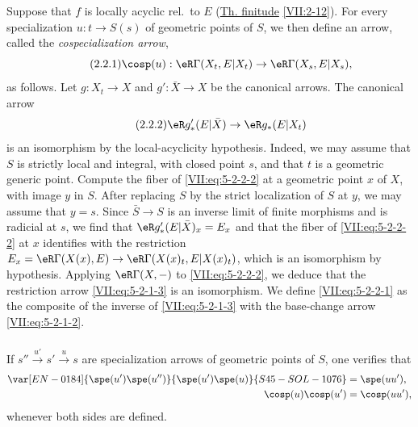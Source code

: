 Suppose that $f$ is locally acyclic rel.\ to $E$ (\hyperref[VII]{Th. finitude} \ref{VII:2-12}). For
every specialization $u:t\to S(s)$ of geometric points of $S$, we then define
an arrow, called the \emph{cospecialization arrow},
\begin{equation*}\tag{2.2.1}\label{VII:eq:5-2-2-1}
  \cosp(u):\eR\Gamma(X_t,E|X_t) \to \eR\Gamma(X_s,E|X_s) \text{,} 
\end{equation*}
as follows. Let $g:X_t\to X$ and $g':\bar X\to X$ be the canonical arrows.
The canonical arrow
\begin{equation*}\tag{2.2.2}\label{VII:eq:5-2-2-2}
  \eR g'_\ast(E|\bar X)\to \eR g_\ast(E|X_t) 
\end{equation*}
is an isomorphism by the local-acyclicity hypothesis. Indeed, we may assume
that $S$ is strictly local and integral, with closed point $s$, and that $t$
is a geometric generic point. Compute the fiber of
\eqref{VII:eq:5-2-2-2} at a geometric point $x$ of $X$, with image $y$ in
$S$. After replacing $S$ by the strict localization of $S$ at $y$, we may
assume that $y=s$. Since $\bar S\to S$ is an inverse limit of finite
morphisms and is radicial at $s$, we find that
$\eR g'_\ast(E|\bar X)_x = E_x$ and that the fiber of
\eqref{VII:eq:5-2-2-2} at $x$ identifies with the restriction
$E_x=\eR\Gamma(X(x),E)\to \eR\Gamma(X(x)_t,E|X(x)_t)$, which is an
isomorphism by hypothesis. Applying $\eR\Gamma(X,-)$ to
\eqref{VII:eq:5-2-2-2}, we deduce that the restriction arrow
\eqref{VII:eq:5-2-1-3} is an isomorphism. We define
\eqref{VII:eq:5-2-2-1} as the composite of the inverse of
\eqref{VII:eq:5-2-1-3} with the base-change arrow
\eqref{VII:eq:5-2-1-2}.






\subsubsection{}\label{VII:5-2-3}

If $s'' \xrightarrow{u'} s' \xrightarrow u s$ are specialization arrows of
geometric points of $S$, one verifies that
\begin{align*}
  \var[EN-0184]{\spe(u')\spe(u'')}{\spe(u')\spe(u)}{S45-SOL-1076} &= \spe(u u') \text{,} \\
  \cosp(u) \cosp(u') &= \cosp(u u') \text{,} 
\end{align*}
whenever both sides are defined.






